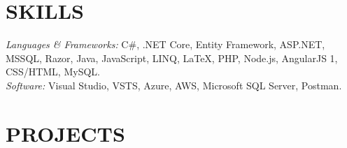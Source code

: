 \documentclass[margin, 10pt, hidelinks]{res} %
\newcommand{\emphasize}{\large\bfseries} %
\begin{document}
\begin{resume}



\section{SKILLS}

{\sl\large Languages \& Frameworks:} 
C\#, .NET Core, Entity Framework, ASP.NET, MSSQL, Razor, Java, JavaScript, LINQ, LaTeX,
{\color{black!70}PHP, Node.js, AngularJS 1, CSS/HTML, MySQL.} \\ 
{\sl\large  Software:} Visual Studio, VSTS, Azure, AWS, Microsoft SQL Server, Postman. 
\section{PROJECTS}


\end{resume}
\end{document}
